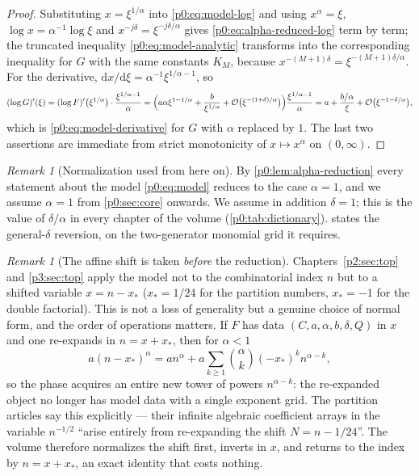 \documentclass[11pt,a4paper,oneside]{book}
\theoremstyle{plain}
\theoremstyle{definition}
\theoremstyle{remark}
\newtheorem{remark}[theorem]{Remark}
\newcommand{\dd}{\mathrm{d}}
\newcommand{\bigO}{\mathcal{O}}
\begin{document}
\begin{proof}
Substituting $x=\xi^{1/\alpha}$ into \eqref{p0:eq:model-log} and using
$x^{\alpha}=\xi$, $\log x=\alpha^{-1}\log\xi$ and
$x^{-j\delta}=\xi^{-j\delta/\alpha}$ gives
\eqref{p0:eq:alpha-reduced-log} term by term; the truncated inequality
\eqref{p0:eq:model-analytic} transforms into the corresponding inequality for
$G$ with the same constants $K_M$, because
$x^{-(M+1)\delta}=\xi^{-(M+1)\delta/\alpha}$.  For the derivative,
$\dd x/\dd\xi=\alpha^{-1}\xi^{1/\alpha-1}$, so
\[
 (\log G)'(\xi)=(\log F)'\bigl(\xi^{1/\alpha}\bigr)
 \cdot\frac{\xi^{1/\alpha-1}}{\alpha}
 =\Bigl(a\alpha\xi^{1-1/\alpha}+\frac{b}{\xi^{1/\alpha}}
        +\bigO\bigl(\xi^{-(1+\delta)/\alpha}\bigr)\Bigr)
   \frac{\xi^{1/\alpha-1}}{\alpha}
 =a+\frac{b/\alpha}{\xi}+\bigO\bigl(\xi^{-1-\delta/\alpha}\bigr),
\]
which is \eqref{p0:eq:model-derivative} for $G$ with $\alpha$ replaced by $1$.
The last two assertions are immediate from strict monotonicity of
$x\mapsto x^\alpha$ on $(0,\infty)$.
\end{proof}

\begin{remark}[Normalization used from here on]\label{p0:rem:alpha-one}
By \cref{p0:lem:alpha-reduction} every statement about the model
\eqref{p0:eq:model} reduces to the case $\alpha=1$, and we assume $\alpha=1$
from \cref{p0:sec:core} onwards.  We assume in addition $\delta=1$; this is the
value of $\delta/\alpha$ in every chapter of the volume
(\cref{p0:tab:dictionary}).   states the general-$\delta$
reversion, on the two-generator monomial grid it requires.
\end{remark}

\begin{remark}[The affine shift is taken \emph{before} the reduction]
\label{p0:rem:affine-shift}
Chapters~\ref{p2:sec:top} and \ref{p3:sec:top} apply the model not to the
combinatorial index $n$ but to a shifted variable $x=n-x_\ast$ ($x_\ast=1/24$
for the partition numbers, $x_\ast=-1$ for the double factorial).  This is not
a loss of generality but a genuine choice of normal form, and the order of
operations matters.  If $F$ has data $(C,a,\alpha,b,\delta,Q)$ in $x$ and one
re-expands in $n=x+x_\ast$, then for $\alpha<1$
\[
 a(n-x_\ast)^{\alpha}
 =an^{\alpha}+a\sum_{k\ge1}\binom{\alpha}{k}(-x_\ast)^kn^{\alpha-k},
\]
so the phase acquires an entire new tower of powers $n^{\alpha-k}$: the
re-expanded object no longer has model data with a single exponent grid.  The
partition articles say this explicitly --- their infinite algebraic
coefficient arrays in the variable $n^{-1/2}$ ``arise entirely from
re-expanding the shift $N=n-1/24$''.  The volume therefore normalizes the
shift first, inverts in $x$, and returns to the index by
$n=x+x_\ast$, an exact identity that costs nothing.
\end{remark}
\end{document}
